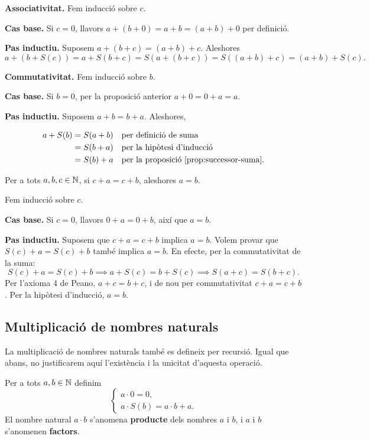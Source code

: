 \begin{prova}
\textbf{Associativitat.} Fem inducció sobre $c$.

\textbf{Cas base.} Si $c=0$, llavors $a+(b+0)=a+b=(a+b)+0$ per definició.

\textbf{Pas inductiu.} Suposem $a+(b+c)=(a+b)+c$. Aleshores
\[
a+(b+S(c))=a+S(b+c)=S(a+(b+c))=S((a+b)+c)=(a+b)+S(c).
\]

\textbf{Commutativitat.} Fem inducció sobre $b$.

\textbf{Cas base.} Si $b=0$, per la proposició anterior $a+0=0+a=a$.

\textbf{Pas inductiu.} Suposem $a+b=b+a$. Aleshores,

\begin{align*}
a+S(b) 
&= S(a+b)
&& \text{per definició de suma} \\
&= S(b+a)
&& \text{per la hipòtesi d'inducció} \\
&= S(b) + a 
&& \text{per la proposició~\ref{prop:successor-suma}}.
\end{align*}
\end{prova}

\begin{exemple}
Per a tots $a,b,c\in \mathbb{N}$, si $c+a=c+b$, aleshores $a=b$.
\end{exemple}

\begin{solucio}
Fem inducció sobre $c$.

\textbf{Cas base.} Si $c=0$, llavors $0+a=0+b$, així que $a=b$.

\textbf{Pas inductiu.} Suposem que $c+a=c+b$ implica $a=b$. Volem provar que $S(c)+a=S(c)+b$ també implica $a=b$. En efecte, per la commutativitat de la suma:
\[
S(c)+a=S(c)+b \implies a+S(c)=b+S(c) \implies S(a+c)=S(b+c).
\]
Per l'axioma 4 de Peano, $a+c=b+c$, i de nou per commutativitat $c+a=c+b$. Per la hipòtesi d'inducció, $a=b$.
\end{solucio}

\subsection{Multiplicació de nombres naturals}

La multiplicació de nombres naturals també es defineix per recursió. Igual que abans, no justificarem aquí l'existència i la unicitat d’aquesta operació.

\begin{definicio}
Per a tots $a,b\in \mathbb{N}$ definim
\[
\left\{
\begin{array}{l}
a\cdot 0=0, \\
a\cdot S(b)=a\cdot b+a.
\end{array}
\right.
\]
El nombre natural $a\cdot b$ s'anomena \textbf{producte} dels nombres $a$ i $b$, i $a$ i $b$ s'anomenen \textbf{factors}.
\end{definicio}

